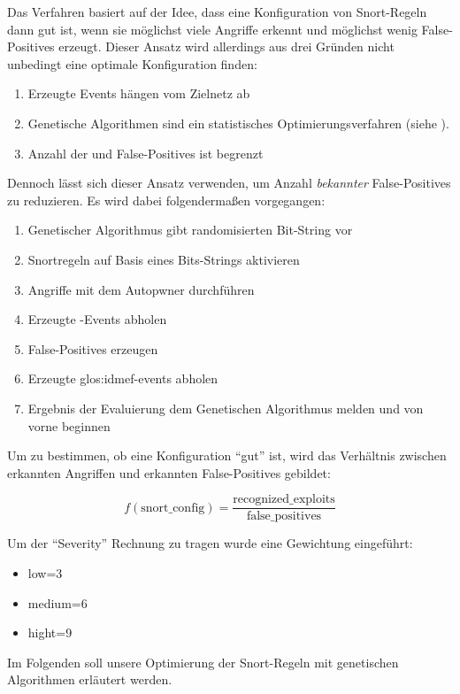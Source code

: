 Das Verfahren basiert auf der Idee, dass eine Konfiguration von
Snort-Regeln dann gut ist, wenn sie möglichst viele Angriffe erkennt
und möglichst wenig False-Positives erzeugt. Dieser Ansatz wird
allerdings aus drei Gründen nicht unbedingt eine
optimale Konfiguration finden:

\begin{enumerate}
  \item Erzeugte Events hängen vom Zielnetz ab
  \item Genetische Algorithmen sind ein statistisches
    Optimierungsverfahren (siehe \cite{mitchel}).
  \item Anzahl der  und False-Positives ist begrenzt
\end{enumerate}

Dennoch lässt sich dieser Ansatz verwenden, um Anzahl
\textit{bekannter} False-Positives zu reduzieren. Es wird dabei
folgendermaßen vorgegangen:

\begin{enumerate}
  \item Genetischer Algorithmus gibt randomisierten Bit-String vor
  \item Snortregeln auf Basis eines Bits-Strings aktivieren
  \item Angriffe mit dem Autopwner durchführen
  \item Erzeugte -Events abholen
  \item False-Positives erzeugen
  \item Erzeugte \glspl{glos:idmef-event} abholen
  \item Ergebnis der Evaluierung dem Genetischen Algorithmus melden
    und von vorne beginnen
\end{enumerate}

Um zu bestimmen, ob eine Konfiguration \enquote{gut} ist, wird das
Verhältnis zwischen erkannten Angriffen und erkannten False-Positives
gebildet:

\[
  f(\text{snort\_config}) = 
    \frac{\text{recognized\_exploits}}{\text{false\_positives}}
\]

Um der \enquote{Severity} Rechnung zu tragen wurde eine Gewichtung
eingeführt:
\begin{itemize}
  \item low=3
  \item medium=6
  \item hight=9
\end{itemize}

Im Folgenden soll unsere Optimierung der Snort-Regeln mit genetischen
Algorithmen erläutert werden.


